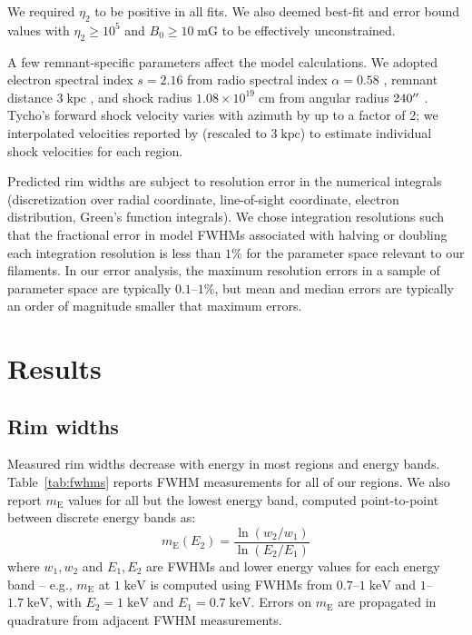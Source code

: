 \documentclass[iop, apj, numberedappendix]{emulateapj}
\newcommand*{\mt}{\mathrm}
\newcommand*{\unit}[1]{\;\mt{#1}}  %
\newcommand*{\mE}{m_\mt{E}}
\begin{document}
We required $\eta_2$ to be positive in all fits.  We also deemed
best-fit and error bound values with $\eta_2 \geq 10^5$ and $B_0 \geq 10
\unit{mG}$ to be effectively unconstrained. %

A few remnant-specific parameters affect the model calculations.  We adopted
electron spectral index $s = 2.16$ from radio spectral index $\alpha = 0.58$
\citep{sun2011}, remnant distance $3 \unit{kpc}$ \citep[cf.][]{hayato2010}, and
shock radius $1.08 \times 10^{19} \unit{cm}$ from angular radius $240\mbox{$^{\prime\prime}$}$
\citep{green2014}.  Tycho's forward shock velocity varies with azimuth by up to
a factor of 2; we interpolated velocities reported by \citet{williams2013}
(rescaled to $3 \unit{kpc}$) to estimate individual shock velocities for each
region.

Predicted rim widths are subject to resolution error in the numerical integrals
(discretization over radial coordinate, line-of-sight coordinate, electron
distribution, Green's function integrals).  We chose integration resolutions
such that the fractional error in model FWHMs associated with halving or
doubling each integration resolution is less than $1\%$ for the parameter space
relevant to our filaments.  In our error analysis, the maximum resolution
errors in a sample of parameter space are typically $0.1$--$1\%$, but mean and
median errors are typically an order of magnitude smaller that maximum errors.

\section{Results}

\subsection{Rim widths}
\label{sec:fwhm-results}

Measured rim widths decrease with energy in most regions and energy bands.
Table~\ref{tab:fwhms} reports FWHM measurements for all of our regions.
We also report $\mE$ values for all but the lowest energy band, computed
point-to-point between discrete energy bands as:
\begin{equation}
    \mE(E_2) = \frac{\ln(w_2/w_1)}{\ln(E_2/E_1)}
\end{equation}
where $w_1, w_2$ and $E_1, E_2$ are FWHMs and lower energy values for each
energy band -- e.g., $\mE$ at $1 \unit{keV}$ is computed using FWHMs from
$0.7$--$1 \unit{keV}$ and $1$--$1.7 \unit{keV}$, with $E_2 = 1 \unit{keV}$ and
$E_1 = 0.7 \unit{keV}$.  Errors on $\mE$ are propagated in quadrature from
adjacent FWHM measurements.
\end{document}
